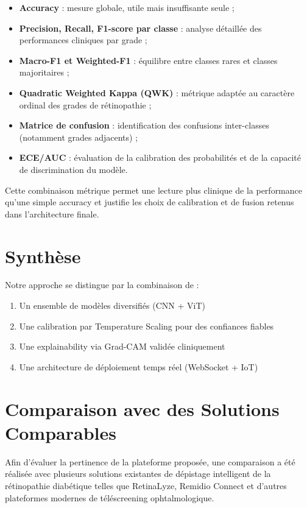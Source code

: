 \documentclass[12pt,a4paper,oneside]{report}
\begin{document}
\begin{itemize}
    \item \textbf{Accuracy} : mesure globale, utile mais insuffisante seule ;
    \item \textbf{Precision, Recall, F1-score par classe} : analyse
        détaillée des performances cliniques par grade ;
    \item \textbf{Macro-F1 et Weighted-F1} : équilibre entre classes rares
        et classes majoritaires ;
    \item \textbf{Quadratic Weighted Kappa (QWK)} : métrique adaptée au
        caractère ordinal des grades de rétinopathie ;
    \item \textbf{Matrice de confusion} : identification des confusions
        inter-classes (notamment grades adjacents) ;
    \item \textbf{ECE/AUC} : évaluation de la calibration des probabilités
        et de la capacité de discrimination du modèle.
\end{itemize}

Cette combinaison métrique permet une lecture plus clinique de la
performance qu'une simple accuracy et justifie les choix de calibration
et de fusion retenus dans l'architecture finale.

\section{Synthèse}

Notre approche se distingue par la combinaison de :
\begin{enumerate}
    \item Un ensemble de modèles diversifiés (CNN + ViT)
    \item Une calibration par Temperature Scaling pour des confiances fiables
    \item Une explainability via Grad-CAM validée cliniquement
    \item Une architecture de déploiement temps réel (WebSocket + IoT)
\end{enumerate}

\section{Comparaison avec des Solutions Comparables}

Afin d'évaluer la pertinence de la plateforme proposée, une comparaison a été réalisée avec plusieurs solutions existantes de dépistage intelligent de la rétinopathie diabétique telles que RetinaLyze, Remidio Connect et d'autres plateformes modernes de téléscreening ophtalmologique.
\end{document}
